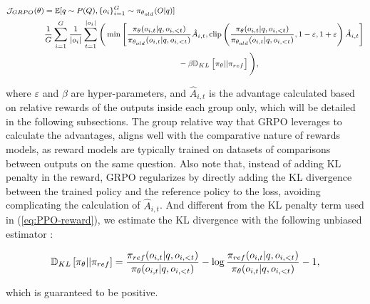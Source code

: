 \begin{itemize}[topsep=0pt]
\begin{equation}
\footnotesize
\begin{split}
    \mathcal{J}_{GRPO}(\theta) &= \mathbb{E}{[q \sim P(Q), \{o_i\}_{i=1}^G \sim \pi_{\theta_{old}}(O|q)]}  \\
    & \frac{1}{G}\sum_{i=1}^G\frac{1}{|o_i|} \sum_{t=1}^{|o_i|} \Bigg( \min \left[ \frac{\pi_\theta(o_{i,t} | q, o_{i,<t})}{\pi_{\theta_{old}}(o_{i,t} | q, o_{i,<t})} \hat{A}_{i,t}, \text{clip} \left( \frac{\pi_\theta(o_{i,t} | q, o_{i,<t})}{\pi_{\theta_{old}}(o_{i,t} | q, o_{i,<t})}, 1 - \varepsilon, 1 + \varepsilon \right)  \hat{A}_{i,t} \right] \\
    &\hspace{5cm} - \beta \mathbb{D}_{KL}\left[\pi_{\theta} || \pi_{ref}\right] \Bigg),
\end{split}
\label{eq:GRPO-obj}
\end{equation}

where $\varepsilon$ and $\beta$ are hyper-parameters, and $\hat{A}_{i,t}$  is the advantage calculated based on relative rewards of the outputs inside each group only, which will be detailed in the following subsections. The group relative way that GRPO leverages to calculate the advantages, aligns well with the comparative nature of rewards models,  as reward models are typically trained on datasets of comparisons between outputs on the same question. Also note that, instead of adding KL penalty in the reward, GRPO regularizes by directly adding the KL divergence between the trained policy and the reference policy to the loss, avoiding complicating the calculation of  $\hat{A}_{i,t}$. And different from the KL penalty term used in (\ref{eq:PPO-reward}), we estimate the KL divergence with the following unbiased estimator \citep{kl_approx}:

\begin{equation}
\small
    \mathbb{D}_{KL}\left[\pi_{\theta} || \pi_{ref}\right] = \frac{\pi_{ref}(o_{i,t}|q,o_{i,<t})}{\pi_{\theta}(o_{i,t}|q,o_{i,<t})} - \log\frac{\pi_{ref}(o_{i,t}|q,o_{i,<t})}{\pi_{\theta}(o_{i,t}|q,o_{i,<t})} - 1,
\end{equation}

which is guaranteed to be positive.


\end{itemize}
